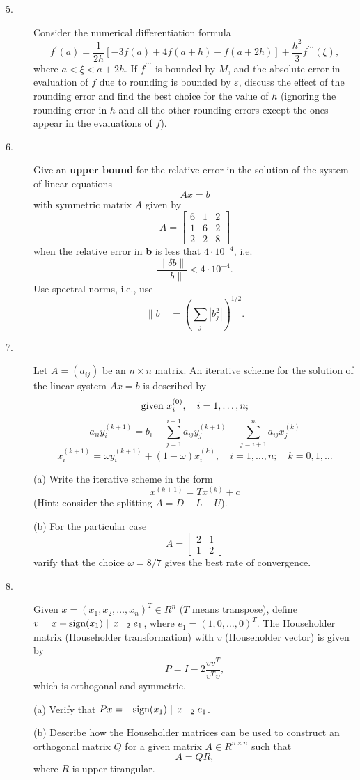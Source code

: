 \documentclass{article}
\begin{document}
\begin{description}
\item[5.]
Consider the numerical differentiation formula
$$f^\prime (a) = \frac{1}{2h} \left[ -3 f(a) + 4f(a+h) - f(a + 2h) \right]
  + \frac{h^2}{3} f^{\prime \prime \prime} (\xi),$$
where $a < \xi < a+2h$. If $f^{\prime \prime \prime}$ is bounded by $M$,
and the absolute error in evaluation of $f$ due to rounding is bounded by
$\varepsilon$, discuss the effect of the rounding error and find the best
choice for the value of $h$ (ignoring the rounding error in $h$ and all the
other rounding errors except the ones appear in the evaluations of $f$).

\item[6.]
Give an {\bf upper bound} for the relative error in the solution of the
system of linear equations
$$Ax=b$$
with symmetric matrix $A$ given by
$$A= \begin{bmatrix}
        6&1&2 \\
        1&6&2 \\
        2&2&8
       \end{bmatrix}$$
when the relative error in {\bf b} is less that $4 \cdot 10^{-4}$, i.e.
$$\frac{\parallel \delta b \parallel}{\parallel b \parallel}
< 4 \cdot 10^{-4}.$$
Use spectral norms, i.e., use
$$\parallel b \parallel = \left( \sum_j |b_j^2| \right)^{1/2}.$$

\item[7.]
Let $A = (a_{ij})$ be an $n \times n$ matrix. An iterative scheme for the
solution of the linear system $Ax = b$ is described by
$$\hbox{given\ } x_i^{(0)}, \quad i = 1, \dots, n;$$
$$a_{ii} y_i^{(k+1)} = b_i - \sum^{i-1}_{j=1} a_{ij}y_j^{(k+1)} -
  \sum^n_{j=i+1} a_{ij}x_j^{(k)}$$
$$x_i^{(k+1)} = \omega y_i^{(k+1)} + (1-\omega) x_i^{(k)}, \quad
    i=1, \dots, n; \quad k = 0,1, \dots $$

\item[\quad] (a)
    Write the iterative scheme in the form
    $$x^{(k+1)} = Tx^{(k)} + c$$
    (Hint: consider the splitting $A=D-L-U$).

\item[\quad] (b)
    For the particular case
    $$A= \begin{bmatrix} 2&1 \\ 1&2 \end{bmatrix}$$
    varify that the choice $\omega = 8/7$ gives the best rate of convergence.

\item[8.]
Given $x= (x_1, x_2, \dots, x_n)^T \in R^n$ ($T$ means transpose), define
$v = x + \hbox{sign} (x_1) \parallel x \parallel _2 e_1$, where
$e_1 = (1,0, \dots, 0)^T$. The Householder matrix (Householder
transformation) with $v$ (Householder vector) is given by
$$P=I - 2 \frac{vv^T}{v^Tv},$$
which is orthogonal and symmetric.

\item[\quad] (a)
Verify that $Px = -\hbox{sign} (x_1) \parallel x \parallel_2 e_1$.

\item[\quad] (b)
Describe how the Householder matrices can be used to construct an orthogonal
matrix $Q$ for a given matrix $A \in R^{n \times n}$ such that
$$A=QR,$$
where $R$ is upper tirangular.


\end{description}    
\end{document}
